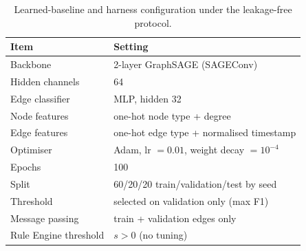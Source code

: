 \begin{table}[t]
\centering
\caption{Learned-baseline and harness configuration under the leakage-free protocol.}
\label{tab:gscfg}
{\small
\begin{tabular}{p{4.6cm}p{8.0cm}}
\toprule
Item & Setting \\
\midrule
Backbone & 2-layer GraphSAGE (SAGEConv) \\
Hidden channels & 64 \\
Edge classifier & MLP, hidden 32 \\
Node features & one-hot node type + degree \\
Edge features & one-hot edge type + normalised timestamp \\
Optimiser & Adam, lr $=0.01$, weight decay $=10^{-4}$ \\
Epochs & 100 \\
Split & 60/20/20 train/validation/test by seed \\
Threshold & selected on validation only (max F1) \\
Message passing & train + validation edges only \\
Rule Engine threshold & $s>0$ (no tuning) \\
\bottomrule
\end{tabular}
}
\end{table}
